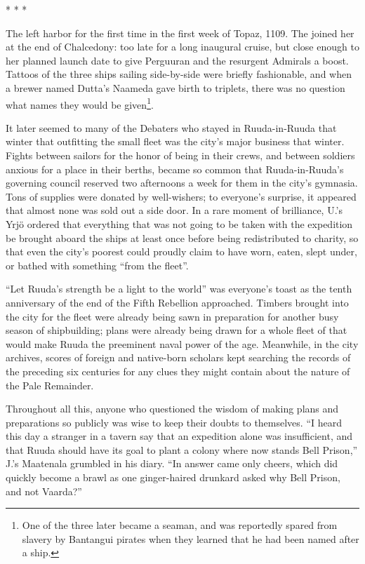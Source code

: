 \documentclass[12pt]{report}
\begin{document}
\begin{center}
* * *
\end{center}

The  left harbor for the first time in the first
week of Topaz, 1109.  The  joined her at the
end of Chalcedony: too late for a long inaugural cruise, but close
enough to her planned launch date to give Perguuran and the resurgent
Admirals a boost.  Tattoos of the three ships sailing side-by-side
were briefly fashionable, and when a brewer named Dutta's Naameda gave
birth to triplets, there was no question what names they would be
given\footnote{One of the three later became a seaman, and was
reportedly spared from slavery by Bantangui pirates when they learned
that he had been named after a ship.}.

It later seemed to many of the Debaters who stayed in Ruuda-in-Ruuda
that winter that outfitting the small fleet was the city's major
business that winter.  Fights between sailors for the honor of being
in their crews, and between soldiers anxious for a place in their
berths, became so common that Ruuda-in-Ruuda's governing council
reserved two afternoons a week for them in the city's gymnasia.  Tons
of supplies were donated by well-wishers; to everyone's surprise, it
appeared that almost none was sold out a side door.  In a rare moment
of brilliance, U.'s Yrj\"{o} ordered that everything that was not
going to be taken with the expedition be brought aboard the ships at
least once before being redistributed to charity, so that even the
city's poorest could proudly claim to have worn, eaten, slept under,
or bathed with something ``from the fleet''.

``Let Ruuda's strength be a light to the world'' was everyone's toast as
the tenth anniversary of the end of the Fifth Rebellion approached.
Timbers brought into the city for the fleet were already being sawn in
preparation for another busy season of shipbuilding; plans were
already being drawn for a whole fleet of  that would
make Ruuda the preeminent naval power of the age.  Meanwhile, in the
city archives, scores of foreign and native-born scholars kept
searching the records of the preceding six centuries for any clues
they might contain about the nature of the Pale Remainder.

Throughout all this, anyone who questioned the wisdom of making plans
and preparations so publicly was wise to keep their doubts to
themselves.  ``I heard this day a stranger in a tavern say that an
expedition alone was insufficient, and that Ruuda should have its goal
to plant a colony where now stands Bell Prison,'' J.'s Maatenala
grumbled in his diary.  ``In answer came only cheers, which did quickly
become a brawl as one ginger-haired drunkard asked why Bell Prison,
and not Vaarda?''
\end{document}
